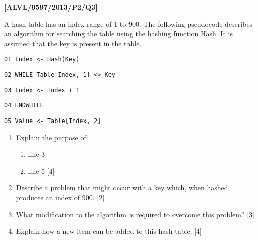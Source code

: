 \item \textbf{{[}ALVL/9597/2013/P2/Q3{]} }

A hash table has an index range of 1 to 900. The following pseudocode
describes an algorithm for searching the table using the hashing function
Hash. It is assumed that the key is present in the table.

\noindent %
\noindent\begin{minipage}[t]{1\columnwidth}%
\texttt{01 Index <- Hash(Key) }

\texttt{02 WHILE Table{[}Index, 1{]} <> Key }

\texttt{03 \qquad{}Index <- Index + 1 }

\texttt{04 ENDWHILE }

\texttt{05 Value <- Table{[}Index, 2{]}}%
\end{minipage}
\begin{enumerate}
\item Explain the purpose of:
\begin{enumerate}
\item line 3
\item line 5\hfill{} {[}4{]}
\end{enumerate}
\item Describe a problem that might occur with a key which, when hashed,
produces an index of 900. \hfill{}{[}2{]}
\item What modification to the algorithm is required to overcome this problem?
\hfill{}{[}3{]}
\item Explain how a new item can be added to this hash table. \hfill{}{[}4{]}
\end{enumerate}